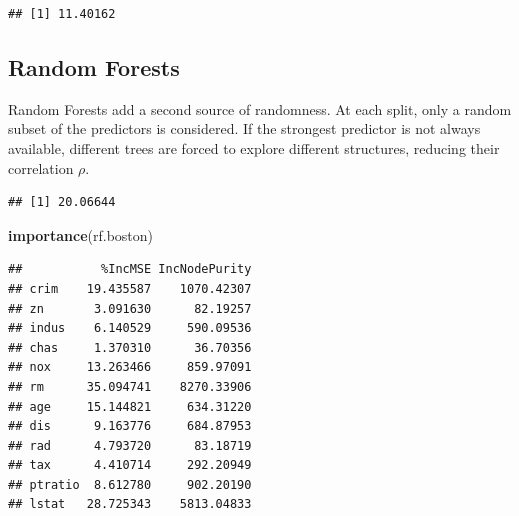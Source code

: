 \documentclass[
  11pt,
]{article}
\newenvironment{Shaded}{\begin{snugshade}}{\end{snugshade}}
\newcommand{\AttributeTok}[1]{\textcolor[rgb]{0.13,0.29,0.53}{#1}}
\newcommand{\ConstantTok}[1]{\textcolor[rgb]{0.56,0.35,0.01}{#1}}
\newcommand{\DecValTok}[1]{\textcolor[rgb]{0.00,0.00,0.81}{#1}}
\newcommand{\FunctionTok}[1]{\textcolor[rgb]{0.13,0.29,0.53}{\textbf{#1}}}
\newcommand{\NormalTok}[1]{#1}
\newcommand{\OtherTok}[1]{\textcolor[rgb]{0.56,0.35,0.01}{#1}}
\newcommand{\SpecialCharTok}[1]{\textcolor[rgb]{0.81,0.36,0.00}{\textbf{#1}}}
\begin{document}
\begin{verbatim}
## [1] 11.40162
\end{verbatim}

\subsection{Random Forests}\label{random-forests}

Random Forests add a second source of randomness. At each split, only a
random subset of the predictors is considered. If the strongest
predictor is not always available, different trees are forced to explore
different structures, reducing their correlation \(\rho\).

\begin{Shaded}
\end{Shaded}

\begin{verbatim}
## [1] 20.06644
\end{verbatim}

\begin{Shaded}
\begin{Highlighting}[]
\FunctionTok{importance}\NormalTok{(rf.boston)}
\end{Highlighting}
\end{Shaded}

\begin{verbatim}
##           %IncMSE IncNodePurity
## crim    19.435587    1070.42307
## zn       3.091630      82.19257
## indus    6.140529     590.09536
## chas     1.370310      36.70356
## nox     13.263466     859.97091
## rm      35.094741    8270.33906
## age     15.144821     634.31220
## dis      9.163776     684.87953
## rad      4.793720      83.18719
## tax      4.410714     292.20949
## ptratio  8.612780     902.20190
## lstat   28.725343    5813.04833
\end{verbatim}
\end{document}

